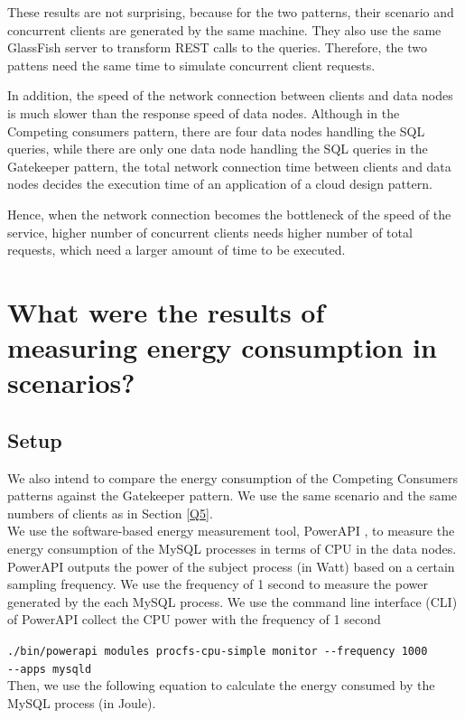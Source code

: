 \documentclass{article}
\begin{document}
These results are not surprising, because for the two patterns, their scenario and concurrent clients are generated by the same machine. They also use the same GlassFish server to transform REST calls to the queries. Therefore, the two pattens need the same time to simulate concurrent client requests. 

In addition, the speed of the network connection between clients and data nodes is much slower than the response speed of data nodes.
Although in the Competing consumers pattern, there are four data nodes handling the SQL queries, while there are only one data node handling the SQL queries in the Gatekeeper pattern, the total network connection time between clients and data nodes decides the execution time of an application of a cloud design pattern.

Hence, when the network connection becomes the bottleneck of the speed of the service, higher number of concurrent clients needs higher number of total requests, which need a larger amount of time to be executed.

\section{What were the results of measuring energy consumption in scenarios?}\label{Q6}
\subsection{Setup}
We also intend to compare the energy consumption of the Competing Consumers patterns against the Gatekeeper pattern. We use the same scenario and the same numbers of clients as in Section \ref{Q5}.\\

We use the software-based energy measurement tool, PowerAPI \cite{}, to measure the energy consumption of the MySQL processes in terms of CPU in the data nodes. PowerAPI outputs the power of the subject process (in Watt) based on a certain sampling frequency. We use the frequency of 1 second to measure the power generated by the each MySQL process. We use the command line interface (CLI) of PowerAPI collect the CPU power with the frequency of 1 second 

\texttt{./bin/powerapi modules procfs-cpu-simple monitor -{}-frequency 1000 \\-{}-apps mysqld}\\

Then, we use the following equation to calculate the energy consumed by the MySQL process (in Joule).
\end{document}
